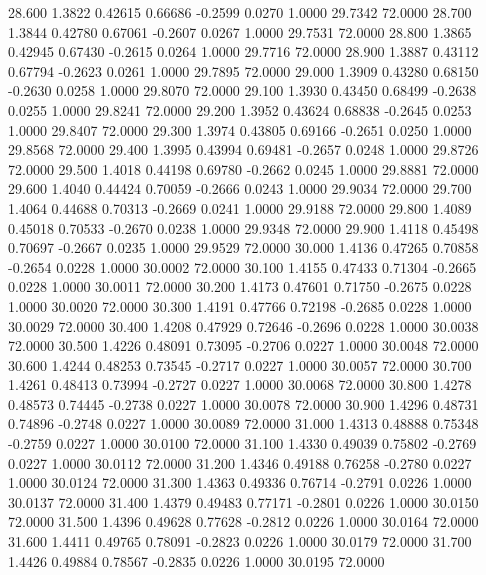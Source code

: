  28.600   1.3822   0.42615   0.66686  -0.2599   0.0270   1.0000  29.7342  72.0000
  28.700   1.3844   0.42780   0.67061  -0.2607   0.0267   1.0000  29.7531  72.0000
  28.800   1.3865   0.42945   0.67430  -0.2615   0.0264   1.0000  29.7716  72.0000
  28.900   1.3887   0.43112   0.67794  -0.2623   0.0261   1.0000  29.7895  72.0000
  29.000   1.3909   0.43280   0.68150  -0.2630   0.0258   1.0000  29.8070  72.0000
  29.100   1.3930   0.43450   0.68499  -0.2638   0.0255   1.0000  29.8241  72.0000
  29.200   1.3952   0.43624   0.68838  -0.2645   0.0253   1.0000  29.8407  72.0000
  29.300   1.3974   0.43805   0.69166  -0.2651   0.0250   1.0000  29.8568  72.0000
  29.400   1.3995   0.43994   0.69481  -0.2657   0.0248   1.0000  29.8726  72.0000
  29.500   1.4018   0.44198   0.69780  -0.2662   0.0245   1.0000  29.8881  72.0000
  29.600   1.4040   0.44424   0.70059  -0.2666   0.0243   1.0000  29.9034  72.0000
  29.700   1.4064   0.44688   0.70313  -0.2669   0.0241   1.0000  29.9188  72.0000
  29.800   1.4089   0.45018   0.70533  -0.2670   0.0238   1.0000  29.9348  72.0000
  29.900   1.4118   0.45498   0.70697  -0.2667   0.0235   1.0000  29.9529  72.0000
  30.000   1.4136   0.47265   0.70858  -0.2654   0.0228   1.0000  30.0002  72.0000
  30.100   1.4155   0.47433   0.71304  -0.2665   0.0228   1.0000  30.0011  72.0000
  30.200   1.4173   0.47601   0.71750  -0.2675   0.0228   1.0000  30.0020  72.0000
  30.300   1.4191   0.47766   0.72198  -0.2685   0.0228   1.0000  30.0029  72.0000
  30.400   1.4208   0.47929   0.72646  -0.2696   0.0228   1.0000  30.0038  72.0000
  30.500   1.4226   0.48091   0.73095  -0.2706   0.0227   1.0000  30.0048  72.0000
  30.600   1.4244   0.48253   0.73545  -0.2717   0.0227   1.0000  30.0057  72.0000
  30.700   1.4261   0.48413   0.73994  -0.2727   0.0227   1.0000  30.0068  72.0000
  30.800   1.4278   0.48573   0.74445  -0.2738   0.0227   1.0000  30.0078  72.0000
  30.900   1.4296   0.48731   0.74896  -0.2748   0.0227   1.0000  30.0089  72.0000
  31.000   1.4313   0.48888   0.75348  -0.2759   0.0227   1.0000  30.0100  72.0000
  31.100   1.4330   0.49039   0.75802  -0.2769   0.0227   1.0000  30.0112  72.0000
  31.200   1.4346   0.49188   0.76258  -0.2780   0.0227   1.0000  30.0124  72.0000
  31.300   1.4363   0.49336   0.76714  -0.2791   0.0226   1.0000  30.0137  72.0000
  31.400   1.4379   0.49483   0.77171  -0.2801   0.0226   1.0000  30.0150  72.0000
  31.500   1.4396   0.49628   0.77628  -0.2812   0.0226   1.0000  30.0164  72.0000
  31.600   1.4411   0.49765   0.78091  -0.2823   0.0226   1.0000  30.0179  72.0000
  31.700   1.4426   0.49884   0.78567  -0.2835   0.0226   1.0000  30.0195  72.0000
